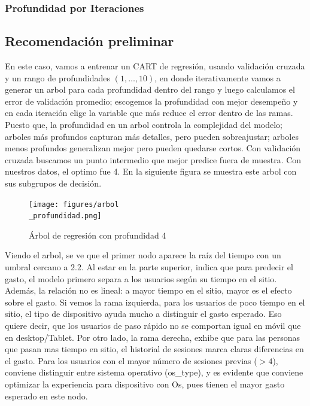 \documentclass[conference]{IEEEtran}
\begin{document}
\hfill \break

\subsubsection{Profundidad por Iteraciones}

\subsection{Recomendación preliminar}


En este caso, vamos a entrenar un CART de regresión, usando validación cruzada y un rango de profundidades $(1,\dots,10)$, en donde iterativamente vamos a generar un arbol para cada profundidad dentro del rango y luego calculamos el error de validación promedio; escogemos la profundidad con mejor desempeño y en cada iteración elige la variable que más reduce el error dentro de las ramas. Puesto que, la profundidad en un arbol controla la complejidad del modelo; arboles más profundos capturan más detalles, pero pueden sobreajustar; arboles menos profundos generalizan mejor pero pueden quedarse cortos. Con validación cruzada buscamos un punto intermedio que mejor predice fuera de muestra. Con nuestros datos, el optimo fue 4. 
En la siguiente figura se muestra este arbol con sus subgrupos de decisión.

\begin{figure}[h]
    \centering
    \texttt{[image: figures/arbol\\\_profundidad.png]}
    \caption{Árbol de regresión con profundidad 4}
    \label{fig:arbol_profundidad}
\end{figure}

Viendo el arbol, se ve que el primer nodo aparece la raíz del tiempo con un umbral cercano a 2.2. Al estar en la parte superior, indica que para predecir el gasto, el modelo primero separa a los usuarios
 según su tiempo en el sitio. Además, la relación no es lineal: a mayor tiempo en el sitio, mayor es el efecto sobre el gasto. Si vemos la rama izquierda, para los usuarios de poco tiempo en el sitio,
  el tipo de dispositivo ayuda mucho a distinguir el gasto esperado. Eso quiere decir, que los usuarios de paso rápido no se comportan igual en móvil que en desktop/Tablet. Por otro lado, la rama derecha, exhibe que para las personas que pasan mas tiempo en sitio, el historial de sesiones marca claras diferencias en el gasto.
   Para los usuarios con el mayor número de sesiones previas ($>4$), conviene distinguir entre sistema operativo (os\_type), y es evidente que conviene optimizar la experiencia para dispositivo con Os, pues tienen el mayor gasto esperado en este nodo.
\end{document}
